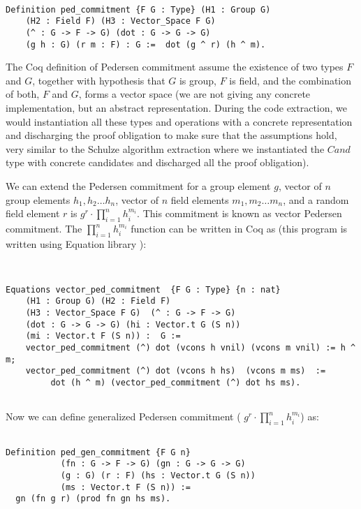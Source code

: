 \begin{verbatim}

Definition ped_commitment {F G : Type} (H1 : Group G) 
	(H2 : Field F) (H3 : Vector_Space F G) 
	(^ : G -> F -> G) (dot : G -> G -> G) 
	(g h : G) (r m : F) : G :=  dot (g ^ r) (h ^ m).

\end{verbatim}

\noindent
The Coq definition of Pedersen commitment assume the existence of two types
$F$ and $G$, together with hypothesis that $G$ is group, $F$ is field, and the combination 
of both, $F$ and $G$, forms a vector space (we are not giving any concrete implementation, 
but an abstract representation.  During the code extraction,  we would instantiation all 
these types and operations with a concrete representation and discharging the proof 
obligation to make sure that the assumptions hold, very similar to the Schulze algorithm 
extraction where we instantiated the $Cand$ type with concrete candidates 
and discharged all the proof obligation).


We can extend the Pedersen commitment for a group element $g$, 
vector of $n$ group elements $h_{1}, h_{2} \dots h_{n}$, vector of $n$ 
field elements $m_{1}, m_{2} \dots m_{n}$, and a random field element 
$r$ is $g^r \cdot \prod_{i = 1}^n  h_{i}^{m_{i}}$.  This commitment is 
known as vector Pedersen commitment. 
The $\prod_{i = 1}^n  h_{i}^{m_{i}}$ function can be written in Coq as 
(this program is written using Equation library \citep{Sozeau:2019:ERH:3352468.3341690}):

\begin{verbatim}


Equations vector_ped_commitment  {F G : Type} {n : nat} 
	(H1 : Group G) (H2 : Field F)
	(H3 : Vector_Space F G)  (^ : G -> F -> G) 
	(dot : G -> G -> G) (hi : Vector.t G (S n)) 
	(mi : Vector.t F (S n)) :  G :=
	vector_ped_commitment (^) dot (vcons h vnil) (vcons m vnil) := h ^ m;
	vector_ped_commitment (^) dot (vcons h hs)  (vcons m ms)  := 
         dot (h ^ m) (vector_ped_commitment (^) dot hs ms).


\end{verbatim}


Now we can define  generalized Pedersen commitment ( $g^r \cdot  \prod_{i = 1}^n  h_{i}^{m_{i}}$) as:

\begin{verbatim}

Definition ped_gen_commitment {F G n}
           (fn : G -> F -> G) (gn : G -> G -> G)
           (g : G) (r : F) (hs : Vector.t G (S n))
           (ms : Vector.t F (S n)) :=
  gn (fn g r) (prod fn gn hs ms).
  
\end{verbatim}
  
